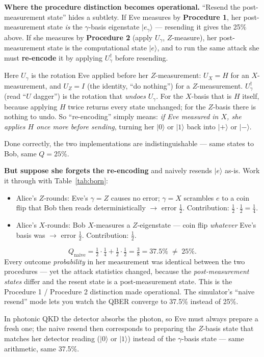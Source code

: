 \documentclass[a4paper,11pt]{article}
\providecommand{\ket}[1]{|#1\rangle}
\begin{document}
\begin{procedurebox}
\textbf{Where the procedure distinction becomes operational.} ``Resend the
post-measurement state'' hides a subtlety. If Eve measures by \textbf{Procedure 1},
her post-measurement state \emph{is} the $\gamma$-basis eigenstate
$\ket{e_\gamma}$ --- resending it gives the 25\% above. If she measures by
\textbf{Procedure 2} (apply $U_\gamma$, $Z$-measure), her post-measurement state is
the computational state $\ket{e}$, and to run the same attack she must
\textbf{re-encode} it by applying $U_\gamma^\dagger$ before resending.

\medskip
Here $U_\gamma$ is the rotation Eve applied before her $Z$-measurement: $U_X = H$ for
an $X$-measurement, and $U_Z = I$ (the identity, ``do nothing'') for a $Z$-measurement.
$U_\gamma^\dagger$ (read ``$U$ dagger'') is the rotation that \emph{undoes} $U_\gamma$.
For the $X$-basis that is $H$ itself, because applying $H$ twice returns every state
unchanged; for the $Z$-basis there is nothing to undo. So ``re-encoding'' simply means:
\emph{if Eve measured in $X$, she applies $H$ once more before sending}, turning her
$\ket{0}$ or $\ket{1}$ back into $\ket{+}$ or $\ket{-}$.

\medskip
Done correctly, the two implementations are indistinguishable --- same states to Bob,
same $Q = 25\%$.

\medskip
\textbf{But suppose she forgets the re-encoding} and naively resends $\ket{e}$
as-is. Work it through with Table~\ref{tab:born}:
\begin{itemize}
    \item Alice's $Z$-rounds: Eve's $\gamma = Z$ causes no error; $\gamma = X$
          scrambles $e$ to a coin flip that Bob then reads deterministically
          $\rightarrow$ error $\tfrac{1}{2}$. Contribution:
          $\tfrac{1}{2} \cdot \tfrac{1}{2} = \tfrac{1}{4}$.
    \item Alice's $X$-rounds: Bob $X$-measures a $Z$-eigenstate --- coin flip
          \emph{whatever} Eve's basis was $\rightarrow$ error $\tfrac{1}{2}$.
          Contribution: $\tfrac{1}{2}$.
\end{itemize}
\begin{equation}
    Q_{\text{naive}} = \tfrac{1}{2} \cdot \tfrac{1}{4}
                     + \tfrac{1}{2} \cdot \tfrac{1}{2}
                     = \tfrac{3}{8} = 37.5\% \;\neq\; 25\%.
    \label{eq:naive}
\end{equation}
Every outcome \emph{probability} in her measurement was identical between the two
procedures --- yet the attack statistics changed, because the
\emph{post-measurement states} differ and the resent state is a post-measurement
state. This is the Procedure 1 / Procedure 2 distinction made operational. The
simulator's ``naive resend'' mode lets you watch the QBER converge to 37.5\% instead
of 25\%.

\medskip
In photonic QKD the detector absorbs the photon, so Eve must always prepare a fresh
one; the naive resend then corresponds to preparing the $Z$-basis state that matches her
detector reading ($\ket{0}$ or $\ket{1}$) instead of the $\gamma$-basis state --- same
arithmetic, same 37.5\%.
\end{procedurebox}
\end{document}
